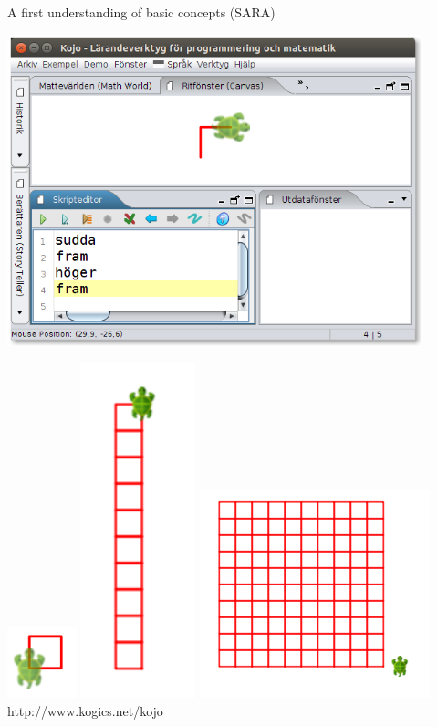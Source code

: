 \documentclass[aspectratio=169]{beamer}
\newenvironment{Slide}[1]%
  {\begin{frame}[environment=Slide]{#1}}
  {\end{frame}}%
\begin{document}
\begin{Slide}{A first understanding of basic concepts (SARA)}
\begin{minipage}{0.6\textwidth}
\includegraphics[width=0.9\textwidth]{Pictures/kojo}  
\end{minipage}%
\begin{minipage}{0.4\textwidth}
 \includegraphics[width=0.15\textwidth]{Pictures/square}%
 \includegraphics[width=0.25\textwidth]{Pictures/square-column}%
 \includegraphics[width=0.5\textwidth]{Pictures/square-grid}  \\
 \vfill\footnotesize{http://www.kogics.net/kojo}
\end{minipage}%
\end{Slide}  
\end{document}

